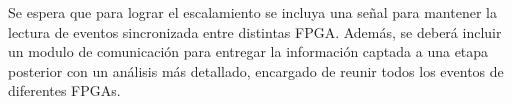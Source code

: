 Se espera que para lograr el escalamiento se incluya una señal para mantener la lectura de eventos sincronizada entre distintas FPGA. Además, se deberá incluir un modulo de comunicación para entregar la información captada a una etapa posterior con un análisis más detallado, encargado de reunir todos los eventos de diferentes FPGAs.
